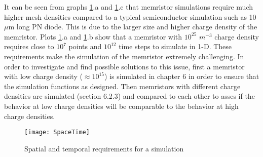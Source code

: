 \begin{doublespace}
It can be seen from graphs \ref{SpaceTime}.a and \ref{SpaceTime}.c that memristor simulations require much higher mesh densities compared to a typical semiconductor simulation such as 10 $\mu$m long PN diode. This is due to the larger size and higher charge density of the memristor. Plots \ref{SpaceTime}.a and \ref{SpaceTime}.b show that a memristor with $10^{25}$ $m^{-3}$ charge density requires close to $10^7$ points and $10^{12}$ time steps to simulate in 1-D. These requirements make the simulation of the memristor extremely challenging. In order to investigate and find possible solutions to this issue, first a memristor with low charge density ($\approx 10^{15}$) is simulated in chapter 6 in order to ensure that the simulation functions as designed. Then memristors with different charge densities are simulated (section 6.2.3) and compared to each other to asses if the behavior at low charge densities will be comparable to the behavior at high charge densities.


\begin{landscape}
\begin{figure}[htp]
\centering
\texttt{[image: SpaceTime]}
\caption{Spatial and temporal requirements for a simulation} 
\label{SpaceTime}
\end{figure}
\end{landscape}

\end{doublespace}
